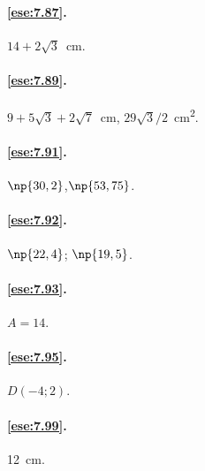 \paragraph{\ref{ese:7.87}.}
$14 + 2\sqrt{3}$~cm.

\paragraph{\ref{ese:7.89}.}
$9 + 5\sqrt{3} + 2\sqrt{7}$~cm,\quad 
$29\sqrt{3}/2$~cm\textsuperscript{2}.

\paragraph{\ref{ese:7.91}.}
$\np{30,2}$,\quad $\np{53,75}$.

\paragraph{\ref{ese:7.92}.}
$\np{22,4}$; $\np{19,5}$.

\paragraph{\ref{ese:7.93}.}
$A=14$.

\paragraph{\ref{ese:7.95}.}
$D(-4;2)$.

\paragraph{\ref{ese:7.99}.}
12~cm.

\endgroup

